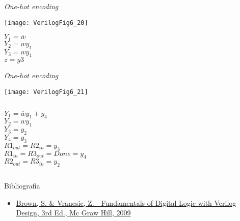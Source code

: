 \begin{frame}{\textit{One-hot encoding}}
\begin{center}
    \texttt{[image: VerilogFig6\_20]} \\
\end{center}
    $Y_1 = \overline{w}$ \\
    $Y_2 = wy_1$ \\
    $Y_3 = w\overline{y}_1$ \\
    $z = y3$ \\
\end{frame}

\begin{frame}{\textit{One-hot encoding}} 
\begin{center}
    \texttt{[image: VerilogFig6\_21]} \\
\end{center}
\begin{columns}
    $Y_1 = \overline{w}y_1 + y_4$ \\
    $Y_2 = wy_1$ \\
    $Y_3 = y_2$ \\
    $Y_4 = y_3$ \\
    $R1_{out} = R2_{in} = y_3$ \\
    $R1_{in}  = R3_{out} = Done = y_4$ \\
    $R2_{out} = R3_{in} = y_2$ \\
\end{columns}
\end{frame}


\begin{frame}{Bibliografia} 
	\begin{itemize}
		\item \href{https://www.google.com.br/search?q=filetype\%3Apdf+Fundamentals+of+Digital+Logic+with+Verilog+Design+&oq=filetype\%3Apdf}{Brown, S. \& Vranesic, Z. - Fundamentals of Digital Logic with Verilog Design, 3rd Ed., Mc Graw Hill, 2009}
	\end{itemize}
\end{frame}

\begin{frame}
	\titlepage
\end{frame} 

